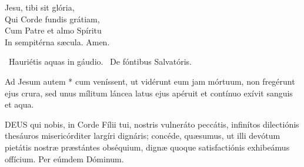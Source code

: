 Jesu, tibi sit glória,\\
Qui Corde fundis grátiam,\\
Cum Patre et almo Spíritu\\
In sempitérna sæcula. Amen.

\V\ Hauriétis aquas in gáudio. \R\ De fóntibus Salvatóris.

 Ad Jesum autem * cum veníssent, ut vidérunt eum jam mórtuum, non fregérunt ejus crura, sed unus mílitum láncea latus ejus apéruit et contínuo exívit sanguis et aqua.


\lettrine[lines=2]{D}{EUS} qui nobis, in Corde Fílii tui, nostris vulneráto peccátis, infinítos dilectiónis thesáuros misericórditer largíri dignáris; concéde, quæsumus, ut illi devótum pietátis nostræ præstántes obséquium, dignæ quoque satisfactiónis exhibeámus offícium. Per eúmdem Dóminum.





